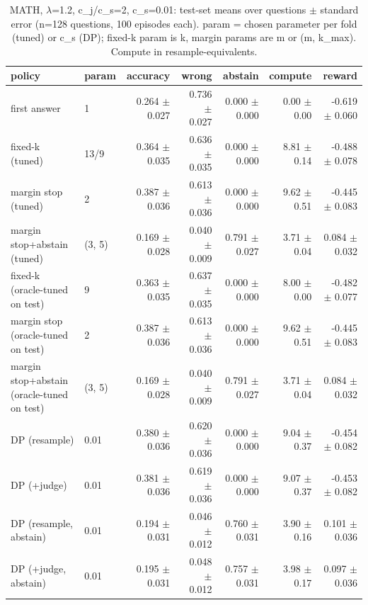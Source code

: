 \begin{table}[t]
\centering
\small
\caption{MATH, $\lambda$=1.2, c\_j/c\_s=2, c\_s=0.01: test-set means over questions $\pm$ standard error (n=128 questions, 100 episodes each). param = chosen parameter per fold (tuned) or c\_s (DP); fixed-k param is k, margin params are m or (m, k\_max). Compute in resample-equivalents.}
\label{tab:headline_math_lam1.2_jr2}
\begin{tabular}{llrrrrr}
\toprule
policy & param & accuracy & wrong & abstain & compute & reward \\
\midrule
first answer & 1 & 0.264 $\pm$ 0.027 & 0.736 $\pm$ 0.027 & 0.000 $\pm$ 0.000 & 0.00 $\pm$ 0.00 & -0.619 $\pm$ 0.060 \\
fixed-k (tuned) & 13/9 & 0.364 $\pm$ 0.035 & 0.636 $\pm$ 0.035 & 0.000 $\pm$ 0.000 & 8.81 $\pm$ 0.14 & -0.488 $\pm$ 0.078 \\
margin stop (tuned) & 2 & 0.387 $\pm$ 0.036 & 0.613 $\pm$ 0.036 & 0.000 $\pm$ 0.000 & 9.62 $\pm$ 0.51 & -0.445 $\pm$ 0.083 \\
margin stop+abstain (tuned) & (3, 5) & 0.169 $\pm$ 0.028 & 0.040 $\pm$ 0.009 & 0.791 $\pm$ 0.027 & 3.71 $\pm$ 0.04 & 0.084 $\pm$ 0.032 \\
fixed-k (oracle-tuned on test) & 9 & 0.363 $\pm$ 0.035 & 0.637 $\pm$ 0.035 & 0.000 $\pm$ 0.000 & 8.00 $\pm$ 0.00 & -0.482 $\pm$ 0.077 \\
margin stop (oracle-tuned on test) & 2 & 0.387 $\pm$ 0.036 & 0.613 $\pm$ 0.036 & 0.000 $\pm$ 0.000 & 9.62 $\pm$ 0.51 & -0.445 $\pm$ 0.083 \\
margin stop+abstain (oracle-tuned on test) & (3, 5) & 0.169 $\pm$ 0.028 & 0.040 $\pm$ 0.009 & 0.791 $\pm$ 0.027 & 3.71 $\pm$ 0.04 & 0.084 $\pm$ 0.032 \\
DP (resample) & 0.01 & 0.380 $\pm$ 0.036 & 0.620 $\pm$ 0.036 & 0.000 $\pm$ 0.000 & 9.04 $\pm$ 0.37 & -0.454 $\pm$ 0.082 \\
DP (+judge) & 0.01 & 0.381 $\pm$ 0.036 & 0.619 $\pm$ 0.036 & 0.000 $\pm$ 0.000 & 9.07 $\pm$ 0.37 & -0.453 $\pm$ 0.082 \\
DP (resample, abstain) & 0.01 & 0.194 $\pm$ 0.031 & 0.046 $\pm$ 0.012 & 0.760 $\pm$ 0.031 & 3.90 $\pm$ 0.16 & 0.101 $\pm$ 0.036 \\
DP (+judge, abstain) & 0.01 & 0.195 $\pm$ 0.031 & 0.048 $\pm$ 0.012 & 0.757 $\pm$ 0.031 & 3.98 $\pm$ 0.17 & 0.097 $\pm$ 0.036 \\
\bottomrule
\end{tabular}
\end{table}
